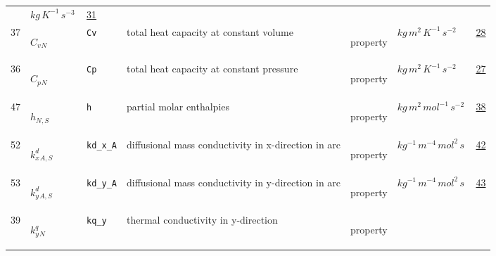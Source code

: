 \begin{longtable}{|p{1cm}|p{2.5cm}|p{4.5cm}|p{8cm}|p{3.0cm}|p{3cm}|p{1cm}|}
             & $ kg \,K^{-1} \,s^{-3} \, $
             &                 \hyperlink{"e:31"}{ 31 }
                 \\
            37
             & \hypertarget{"v:37"}{ $ {{C_v}}{_{N}} $}
             & \verb|Cv|
             & total heat capacity at constant volume
             & \begin{lay}property \end{lay}
             & $ kg \,m^{2} \,K^{-1} \,s^{-2} \, $
             &                 \hyperlink{"e:28"}{ 28 }
                 \\
            36
             & \hypertarget{"v:36"}{ $ {{C_p}}{_{N}} $}
             & \verb|Cp|
             & total heat capacity at constant pressure
             & \begin{lay}property \end{lay}
             & $ kg \,m^{2} \,K^{-1} \,s^{-2} \, $
             &                 \hyperlink{"e:27"}{ 27 }
                 \\
            47
             & \hypertarget{"v:47"}{ $ {h}{_{N, S}} $}
             & \verb|h|
             & partial molar enthalpies
             & \begin{lay}property \end{lay}
             & $ kg \,m^{2} \,mol^{-1} \,s^{-2} \, $
             &                 \hyperlink{"e:38"}{ 38 }
                 \\
            52
             & \hypertarget{"v:52"}{ $ {{k^d_x}}{_{A, S}} $}
             & \verb|kd_x_A|
             & diffusional mass conductivity in x-direction in arc
             & \begin{lay}property \end{lay}
             & $ kg^{-1} \,m^{-4} \,mol^{2} \,s \, $
             &                 \hyperlink{"e:42"}{ 42 }
                 \\
            53
             & \hypertarget{"v:53"}{ $ {{k^d_y}}{_{A, S}} $}
             & \verb|kd_y_A|
             & diffusional mass conductivity in y-direction in arc
             & \begin{lay}property \end{lay}
             & $ kg^{-1} \,m^{-4} \,mol^{2} \,s \, $
             &                 \hyperlink{"e:43"}{ 43 }
                 \\
            39
             & \hypertarget{"v:39"}{ $ {{k^q_y}}{_{N}} $}
             & \verb|kq_y|
             & thermal conductivity in y-direction
             & \begin{lay}property \end{lay}

\end{longtable}
